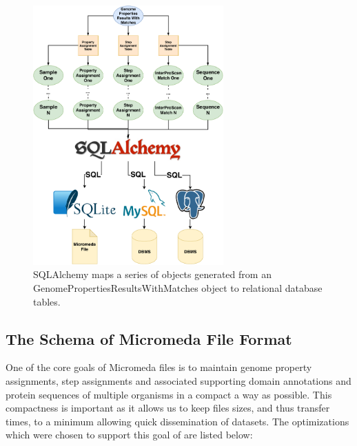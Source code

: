 \begin{figure}[!ht]
  \centering
	\includegraphics[width=0.65\textwidth]{media/SQLAlchemy.pdf}
	 \caption{SQLAlchemy maps a series of objects generated from an GenomePropertiesResultsWithMatches object to relational database tables.}
	 \label{fig:sqlalchemy}
\end{figure}

\subsection{The Schema of Micromeda File Format}

One of the core goals of Micromeda files is to maintain genome property assignments,  step assignments and associated supporting domain annotations and protein sequences of multiple organisms in a compact a way as possible. This compactness is important as it allows us to keep files sizes, and thus transfer times, to a minimum allowing quick dissemination of datasets. The optimizations which were chosen to support this goal of are listed below:

